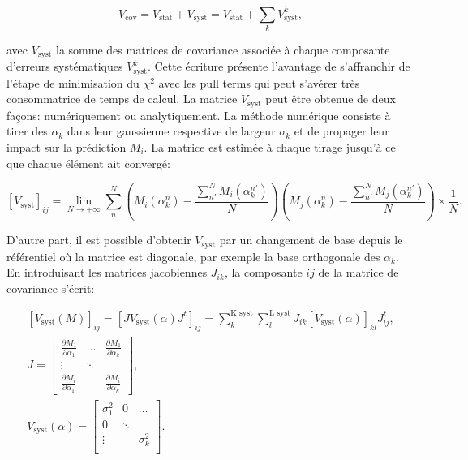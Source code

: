 \begin{equation}
    V_\textrm{cov} = V_\textrm{stat} + V_\textrm{syst} = V_\textrm{stat} + \sum_k V_\textrm{syst}^k,
\end{equation}

\bigbreak

avec $V_\textrm{syst}$ la somme des matrices de covariance associée à chaque composante d'erreurs systématiques $V_\textrm{syst}^k$. Cette écriture présente l'avantage de s'affranchir de l'étape de minimisation du $\chi^2$ avec les pull terms qui peut s'avérer très consommatrice de temps de calcul. La matrice $V_\textrm{syst}$ peut être obtenue de deux façons: numériquement ou analytiquement. La méthode numérique consiste à tirer des $\alpha_k$ dans leur gaussienne respective de largeur $\sigma_k$ et de propager leur impact sur la prédiction $M_i$. La matrice est estimée à chaque tirage jusqu'à ce que chaque élément ait convergé:

\begin{equation}
    \left[ V_\textrm{syst} \right]_{ij} = \lim\limits_{N \to +\infty} \sum_n^N \left(M_i(\alpha^n_k) - \frac{\sum_{n'}^N M_i(\alpha^{n'}_k)}{N}\right) \left(M_j(\alpha^n_k) - \frac{\sum_{n'}^N M_j(\alpha^{n'}_k)}{N}\right) \times \frac{1}{N}.
\end{equation}

\bigbreak

D'autre part, il est possible d'obtenir $V_\textrm{syst}$ par un changement de base depuis le référentiel où la matrice est diagonale, par exemple la base orthogonale des $\alpha_k$. En introduisant les matrices jacobiennes $J_{ik}$, la composante $ij$ de la matrice de covariance s'écrit:

\begin{equation}
\label{eq:covariance_basis_change}
\begin{gathered}
    \left[ V_\textrm{syst}(M) \right]_{ij} = \left[ J V_\textrm{syst}(\alpha) J^t \right]_{ij} = \sum_k^\textrm{K syst} \sum_l^\textrm{L syst} J_{ik} \left[ V_\textrm{syst}(\alpha) \right]_{kl} J^t_{lj},\\
    J = \begin{bmatrix} \frac{\partial M_1}{\partial \alpha_{1}} & \dots & \frac{\partial M_{1}}{\partial \alpha_{k}} \\
    \vdots & \ddots \\
    \frac{\partial M_{i}}{\partial \alpha_{1}} & & \frac{\partial M_{i}}{\partial \alpha_{k}}\end{bmatrix},\\
    V_\textrm{syst}(\alpha) = \begin{bmatrix} \sigma^2_{1} & 0 & \dots \\
    0 & \ddots &  \\
    \vdots &  & \sigma^2_{k}  \\
\end{bmatrix}.
\end{gathered}
\end{equation}

